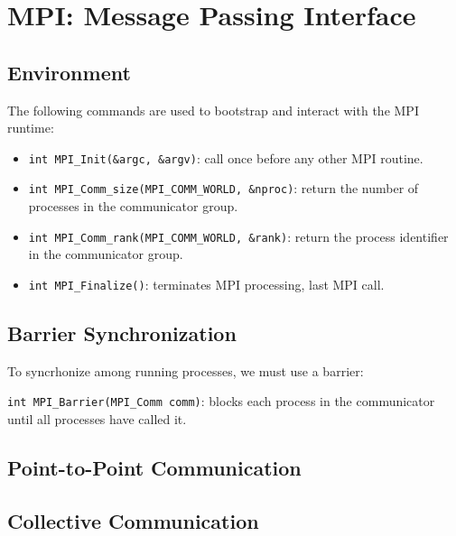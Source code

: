 \section{MPI: Message Passing Interface}

\subsection{Environment}
The following commands are used to bootstrap and interact with the MPI runtime:
\begin{itemize}
    \item \texttt{int MPI\_Init(\&argc, \&argv)}: call once before any other MPI routine.
    \item \texttt{int MPI\_Comm\_size(MPI\_COMM\_WORLD, \&nproc)}: return the number of processes in the communicator group.
    \item \texttt{int MPI\_Comm\_rank(MPI\_COMM\_WORLD, \&rank)}: return the process identifier in the communicator group.
    \item \texttt{int MPI\_Finalize()}: terminates MPI processing, last MPI call.
\end{itemize}

\subsection{Barrier Synchronization}
To syncrhonize among running processes, we must use a barrier:

\texttt{int MPI\_Barrier(MPI\_Comm comm)}: blocks each process in the communicator until all processes have called it.

\subsection{Point-to-Point Communication}

\subsection{Collective Communication}
